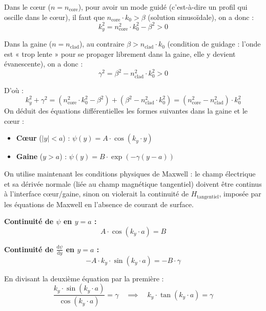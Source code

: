 \documentclass[a4paper,11pt]{report}
\begin{document}
Dans le cœur ($n = n_{\text{core}}$), pour avoir un mode guidé (c'est-à-dire un profil qui oscille dans le cœur), il faut que $n_{\text{core}} \cdot k_0 > \beta$ (solution sinusoïdale), on a donc :
\begin{equation}
k_y^2 = n_{\text{core}}^2 \cdot k_0^2 - \beta^2 > 0
\end{equation}

Dans la gaine ($n = n_{\text{clad}}$), au contraire $\beta > n_{\text{clad}} \cdot k_0$ (condition de guidage : l'onde est « trop lente » pour se propager librement dans la gaine, elle y devient évanescente), on a donc :
\begin{equation}
\gamma^2 = \beta^2 - n_{\text{clad}}^2 \cdot k_0^2 > 0
\end{equation}

D'où :
\begin{equation}
k_y^2 + \gamma^2 = (n_{\text{core}}^2 \cdot k_0^2 - \beta^2) + (\beta^2 - n_{\text{clad}}^2 \cdot k_0^2) = (n_{\text{core}}^2 - n_{\text{clad}}^2) \cdot k_0^2
\end{equation}
On déduit des équations différentielles les formes suivantes dans la gaine et le cœur :
\begin{itemize}
    \item \textbf{Cœur} ($|y| < a$) : $\psi(y) = A \cdot \cos(k_y \cdot y)$
    \item \textbf{Gaine} ($y > a$) : $\psi(y) = B \cdot \exp(-\gamma (y-a))$
\end{itemize}
On utilise maintenant les conditions physiques de Maxwell : le champ électrique et sa dérivée normale (liée au champ magnétique tangentiel) doivent être continus à l'interface cœur/gaine, sinon on violerait la continuité de $H_{\text{tangentiel}}$, imposée par les équations de Maxwell en l'absence de courant de surface.

\vspace{0.5em}
\noindent \textbf{Continuité de $\psi$ en $y=a$ :}
\begin{equation}
A \cdot \cos(k_y \cdot a) = B
\end{equation}

\noindent \textbf{Continuité de $\frac{\text{d}\psi}{\text{d}y}$ en $y=a$ :}
\begin{equation}
-A \cdot k_y \cdot \sin(k_y \cdot a) = -B \cdot \gamma
\end{equation}

En divisant la deuxième équation par la première :
\begin{equation}
\frac{k_y \cdot \sin(k_y \cdot a)}{\cos(k_y \cdot a)} = \gamma \quad \implies \quad k_y \cdot \tan(k_y \cdot a) = \gamma
\label{eq:transcendante_ch1}
\end{equation}
\end{document}
